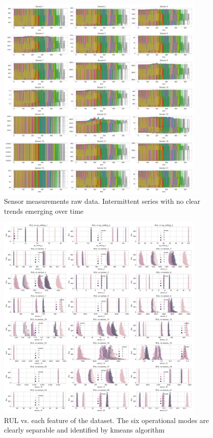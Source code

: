 \documentclass[letterpaper, 10 pt, conference, onecolumn]{ieeeconf}  %
\begin{document}
\begin{figure}[!h]
    \centering
    \includegraphics[width=0.9\textwidth]{plots/eda_sensors_raw.png}
    \caption{Sensor measurements raw data. Intermittent series with no clear trends emerging over time}
    \label{fig:sensors-raw}
\end{figure}

\begin{figure}[!h]
    \centering
    \includegraphics[width=0.9\textwidth]{plots/eda_scatters_cluster.png}
    \caption{RUL vs. each feature of the dataset. The six operational modes are clearly separable and identified by kmeans algorithm}
    \label{fig:rul-features-scatter-cluster}
\end{figure}
\end{document}
